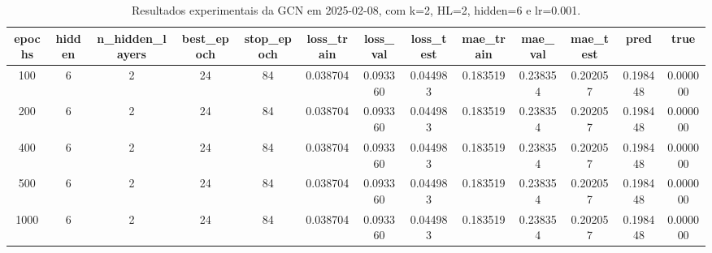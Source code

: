 \begin{table}[h]
\centering
\caption{Resultados experimentais da GCN em 2025-02-08, com k=2, HL=2, hidden=6 e lr=0.001.}
\label{tab:gcn_results_k2_hl2_h6_d20250208}
\begin{tabular}{ccccccccccccc}
\toprule
epochs & hidden & n\_hidden\_layers & best\_epoch & stop\_epoch & loss\_train & loss\_val & loss\_test & mae\_train & mae\_val & mae\_test & pred & true \\
\midrule
100 & 6 & 2 & 24 & 84 & 0.038704 & 0.093360 & 0.044983 & 0.183519 & 0.238354 & 0.202057 & 0.198448 & 0.000000 \\
200 & 6 & 2 & 24 & 84 & 0.038704 & 0.093360 & 0.044983 & 0.183519 & 0.238354 & 0.202057 & 0.198448 & 0.000000 \\
400 & 6 & 2 & 24 & 84 & 0.038704 & 0.093360 & 0.044983 & 0.183519 & 0.238354 & 0.202057 & 0.198448 & 0.000000 \\
500 & 6 & 2 & 24 & 84 & 0.038704 & 0.093360 & 0.044983 & 0.183519 & 0.238354 & 0.202057 & 0.198448 & 0.000000 \\
1000 & 6 & 2 & 24 & 84 & 0.038704 & 0.093360 & 0.044983 & 0.183519 & 0.238354 & 0.202057 & 0.198448 & 0.000000 \\
\bottomrule
\end{tabular}
\end{table}
